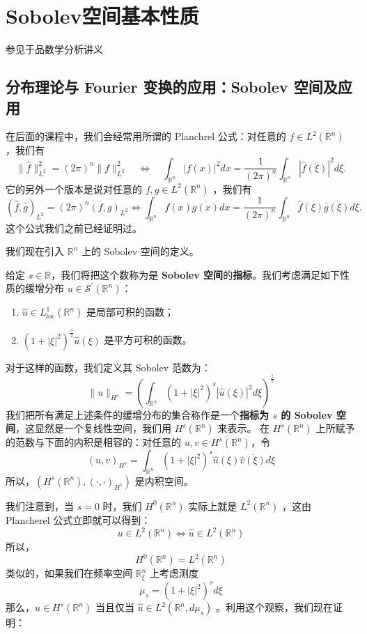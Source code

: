 \section{Sobolev空间基本性质}

参见于品数学分析讲义

\subsection{分布理论与 Fourier 变换的应用：Sobolev 空间及应用}

在后面的课程中，我们会经常用所谓的 Planchrel 公式：对任意的 $f \in L^2\left(\mathbb{R}^n\right)$ ，我们有
\[
\|\widehat{f}\|_{L^2}^2=(2 \pi)^n\|f\|_{L^2}^2 \quad \Leftrightarrow \quad \int_{\mathbb{R}^n}|f(x)|^2 d x=\frac{1}{(2 \pi)^n} \int_{\mathbb{R}^n}|\widehat{f}(\xi)|^2 d \xi .
\]
它的另外一个版本是说对任意的 $f, g \in L^2\left(\mathbb{R}^n\right)$ ，我们有
\[
(\widehat{f}, \widehat{g})_{L^2}=(2 \pi)^n(f, g)_{L^2} \Leftrightarrow \int_{\mathbb{R}^n} f(x) \overline{g(x)} d x=\frac{1}{(2 \pi)^n} \int_{\mathbb{R}^n} \widehat{f}(\xi) \overline{\bar{g}(\xi)} d \xi .
\]
这个公式我们之前已经证明过。

我们现在引入 $\mathbb{R}^n$ 上的 Sobolev 空间的定义。

\begin{definition}
给定 $s \in \mathbb{R}$，我们将把这个数称为是 \textbf{Sobolev 空间}的\textbf{指标}。我们考虑满足如下性质的缓增分布 $u \in \mathcal{S}^{\prime}\left(\mathbb{R}^n\right)$：
	\begin{enumerate}
		\item $\widehat{u} \in L_{\mathrm{loc}}^1\left(\mathbb{R}^n\right)$ 是局部可积的函数；
		\item $\left(1+|\xi|^2\right)^{\frac{s}{2}} \widehat{u}(\xi)$ 是平方可积的函数。
	\end{enumerate}
对于这样的函数，我们定义其 Sobolev 范数为：
\[
\|u\|_{H^s}=\left(\int_{\mathbb{R}^n}\left(1+|\xi|^2\right)^s|\widehat{u}(\xi)|^2 d \xi\right)^{\frac{1}{2}}
\]我们把所有满足上述条件的缓增分布的集合称作是一个\textbf{指标为 $s$ 的 Sobolev 空间}，这显然是一个复线性空间，我们用 $H^s\left(\mathbb{R}^n\right)$ 来表示。
在 $H^s\left(\mathbb{R}^n\right)$ 上所赋予的范数与下面的内积是相容的：对任意的 $u, v \in H^s\left(\mathbb{R}^n\right)$，令
\[
(u, v)_{H^s}=\int_{\mathbb{R}^n}\left(1+|\xi|^2\right)^s \widehat{u}(\xi) \overline{\widehat{v}(\xi)} d \xi
\]所以，$\left(H^s\left(\mathbb{R}^n\right),(\cdot, \cdot)_{H^s}\right)$ 是内积空间。
\end{definition}
我们注意到，当 $s=0$ 时，我们 $H^0(\mathbb{R}^n)$ 实际上就是 $L^2(\mathbb{R}^n)$ ，这由 Plancherel 公式立即就可以得到：
\[
u \in L^2\left(\mathbb{R}^n\right) \Leftrightarrow \widehat{u} \in L^2\left(\mathbb{R}^n\right)
\]
所以，
\[
H^0\left(\mathbb{R}^n\right)=L^2\left(\mathbb{R}^n\right)
\]
类似的，如果我们在频率空间 $\mathbb{R}_{\xi}^n$ 上考虑测度
\[
\mu_s=\left(1+|\xi|^2\right)^s d \xi
\]
那么，$u \in H^s\left(\mathbb{R}^n\right)$ 当且仅当 $\widehat{u} \in L^2\left(\mathbb{R}^n, d \mu_s\right)$ 。利用这个观察，我们现在证明：

